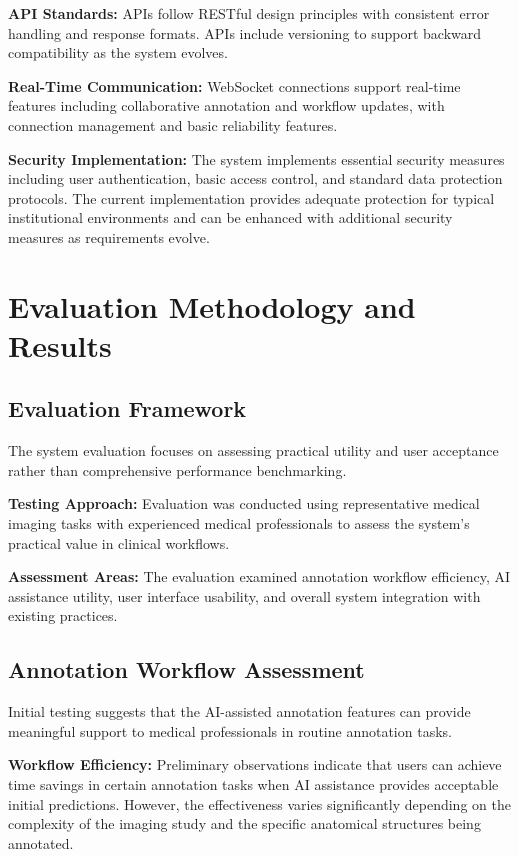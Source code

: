 \textbf{API Standards:} APIs follow RESTful design principles with consistent error handling and response formats. APIs include versioning to support backward compatibility as the system evolves.

\textbf{Real-Time Communication:} WebSocket connections support real-time features including collaborative annotation and workflow updates, with connection management and basic reliability features.

\textbf{Security Implementation:} The system implements essential security measures including user authentication, basic access control, and standard data protection protocols. The current implementation provides adequate protection for typical institutional environments and can be enhanced with additional security measures as requirements evolve.

\section{Evaluation Methodology and Results}

\subsection{Evaluation Framework}

The system evaluation focuses on assessing practical utility and user acceptance rather than comprehensive performance benchmarking.

\textbf{Testing Approach:} Evaluation was conducted using representative medical imaging tasks with experienced medical professionals to assess the system's practical value in clinical workflows.

\textbf{Assessment Areas:} The evaluation examined annotation workflow efficiency, AI assistance utility, user interface usability, and overall system integration with existing practices.

\subsection{Annotation Workflow Assessment}

Initial testing suggests that the AI-assisted annotation features can provide meaningful support to medical professionals in routine annotation tasks.

\textbf{Workflow Efficiency:} Preliminary observations indicate that users can achieve time savings in certain annotation tasks when AI assistance provides acceptable initial predictions. However, the effectiveness varies significantly depending on the complexity of the imaging study and the specific anatomical structures being annotated.

